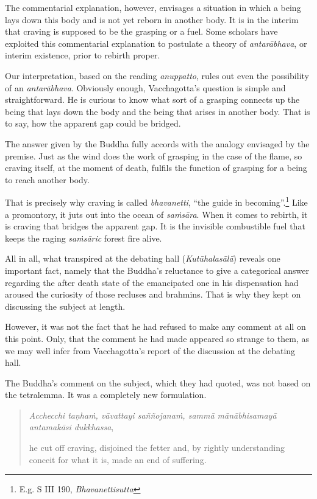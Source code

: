 The commentarial explanation, however, envisages a situation in which a being lays down this body and is not yet reborn in another body. It is in the interim that craving is supposed to be the grasping or a fuel. Some scholars have exploited this commentarial explanation to postulate a theory of \emph{antarābhava}, or interim existence, prior to rebirth proper.

Our interpretation, based on the reading \emph{anuppatto}, rules out even the possibility of an \emph{antarābhava}. Obviously enough, Vacchagotta's question is simple and straightforward. He is curious to know what sort of a grasping connects up the being that lays down the body and the being that arises in another body. That is to say, how the apparent gap could be bridged.

The answer given by the Buddha fully accords with the analogy envisaged by the premise. Just as the wind does the work of grasping in the case of the flame, so craving itself, at the moment of death, fulfils the function of grasping for a being to reach another body.

That is precisely why craving is called \emph{bhavanetti}, ``the guide in becoming''.\footnote{E.g. S III 190, \emph{Bhavanettisutta}} Like a promontory, it juts out into the ocean of \emph{saṁsāra}. When it comes to rebirth, it is craving that bridges the apparent gap. It is the invisible combustible fuel that keeps the raging \emph{saṁsāric} forest fire alive.

All in all, what transpired at the debating hall (\emph{Kutūhalasālā}) reveals one important fact, namely that the Buddha's reluctance to give a categorical answer regarding the after death state of the emancipated one in his dispensation had aroused the curiosity of those recluses and brahmins. That is why they kept on discussing the subject at length.

However, it was not the fact that he had refused to make any comment at all on this point. Only, that the comment he had made appeared so strange to them, as we may well infer from Vacchagotta's report of the discussion at the debating hall.

The Buddha's comment on the subject, which they had quoted, was not based on the tetralemma. It was a completely new formulation.

\begin{quote}
\emph{Acchecchi taṇhaṁ, vāvattayi saññojanaṁ, sammā mānābhisamayā antamakāsi dukkhassa},

he cut off craving, disjoined the fetter and, by rightly understanding conceit for what it is, made an end of suffering.
\end{quote}

